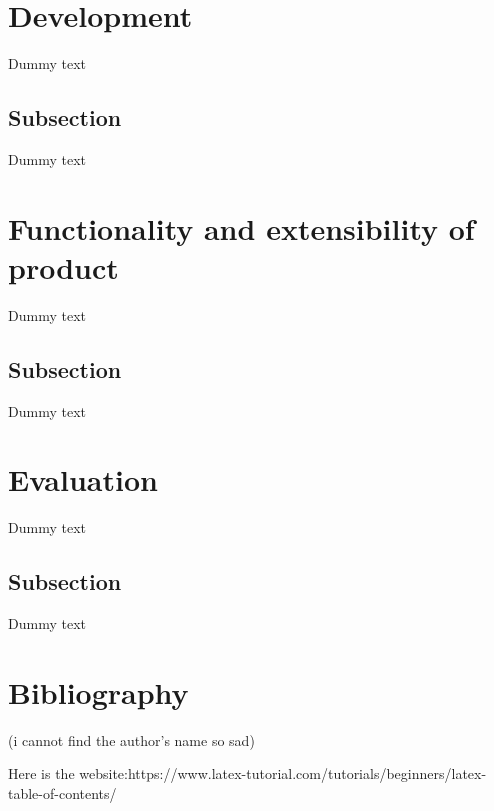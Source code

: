 \documentclass{article}
\begin{document}
\section{Development}



Dummy text

\subsection{Subsection}



Dummy text




\newpage

\section{Functionality and extensibility of product}

Dummy text

\subsection{Subsection}

Dummy text

\section{Evaluation}

Dummy text

\subsection{Subsection}

Dummy text




\newpage

\section{Bibliography}
(i cannot find the author's name so sad)

Here is the website:https://www.latex-tutorial.com/tutorials/beginners/latex-table-of-contents/
\end{document}
